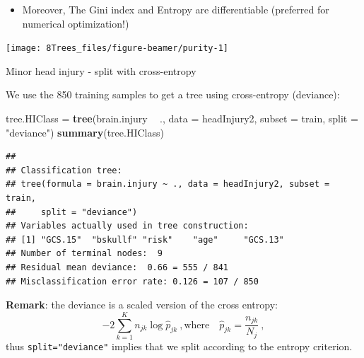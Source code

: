 \documentclass[10pt,ignorenonframetext,]{beamer}
\newenvironment{Shaded}{\begin{snugshade}}{\end{snugshade}}
\newcommand{\KeywordTok}[1]{\textcolor[rgb]{0.13,0.29,0.53}{\textbf{#1}}}
\newcommand{\DataTypeTok}[1]{\textcolor[rgb]{0.13,0.29,0.53}{#1}}
\newcommand{\StringTok}[1]{\textcolor[rgb]{0.31,0.60,0.02}{#1}}
\newcommand{\OperatorTok}[1]{\textcolor[rgb]{0.81,0.36,0.00}{\textbf{#1}}}
\newcommand{\NormalTok}[1]{#1}
\providecommand{\tightlist}{%
  \setlength{\itemsep}{0pt}\setlength{\parskip}{0pt}}
\begin{document}
\begin{frame}

\begin{itemize}
\tightlist
\item
  Moreover, The Gini index and Entropy are differentiable (preferred for
  numerical optimization!)
\end{itemize}

\begin{center}\texttt{[image: 8Trees\_files/figure-beamer/purity-1]} \end{center}

\end{frame}

\begin{frame}[fragile]

\begin{block}{Minor head injury - split with cross-entropy}

\vspace{1mm}

We use the 850 training samples to get a tree using cross-entropy
(deviance):

\scriptsize

\begin{Shaded}
\begin{Highlighting}[]
\NormalTok{tree.HIClass =}\StringTok{ }\KeywordTok{tree}\NormalTok{(brain.injury }\OperatorTok{~}\StringTok{ }\NormalTok{., }\DataTypeTok{data =}\NormalTok{ headInjury2, }\DataTypeTok{subset =}\NormalTok{ train, }
    \DataTypeTok{split =} \StringTok{"deviance"}\NormalTok{)}
\KeywordTok{summary}\NormalTok{(tree.HIClass)}
\end{Highlighting}
\end{Shaded}

\begin{verbatim}
## 
## Classification tree:
## tree(formula = brain.injury ~ ., data = headInjury2, subset = train, 
##     split = "deviance")
## Variables actually used in tree construction:
## [1] "GCS.15"  "bskullf" "risk"    "age"     "GCS.13" 
## Number of terminal nodes:  9 
## Residual mean deviance:  0.66 = 555 / 841 
## Misclassification error rate: 0.126 = 107 / 850
\end{verbatim}

\normalsize

\small
\vspace{1mm} \textbf{Remark}: the deviance is a scaled version of the
cross entropy:
\[-2\sum_{k=1}^K n_{jk} \log\hat{p}_{jk}\ , \text{where} \quad   \hat{p}_{jk}=\frac{n_{jk}}{N_j}\ , \]
thus \texttt{split="deviance"} implies that we split according to the
entropy criterion.

\end{block}

\end{frame}
\end{document}
